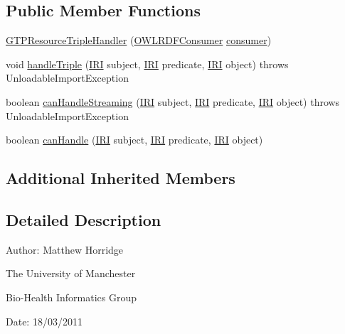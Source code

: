 \subsection*{Public Member Functions}
\begin{DoxyCompactItemize}
\item 
\hyperlink{classorg_1_1coode_1_1owlapi_1_1rdfxml_1_1parser_1_1_g_t_p_resource_triple_handler_a57b64e6c30bee13f03f3be63c5b883a1}{G\-T\-P\-Resource\-Triple\-Handler} (\hyperlink{classorg_1_1coode_1_1owlapi_1_1rdfxml_1_1parser_1_1_o_w_l_r_d_f_consumer}{O\-W\-L\-R\-D\-F\-Consumer} \hyperlink{classorg_1_1coode_1_1owlapi_1_1rdfxml_1_1parser_1_1_abstract_triple_handler_a4ccf4d898ff01eb1cadfa04b23d54e9c}{consumer})
\item 
void \hyperlink{classorg_1_1coode_1_1owlapi_1_1rdfxml_1_1parser_1_1_g_t_p_resource_triple_handler_acbafda7876f3607f88690c8ff4276bc7}{handle\-Triple} (\hyperlink{classorg_1_1semanticweb_1_1owlapi_1_1model_1_1_i_r_i}{I\-R\-I} subject, \hyperlink{classorg_1_1semanticweb_1_1owlapi_1_1model_1_1_i_r_i}{I\-R\-I} predicate, \hyperlink{classorg_1_1semanticweb_1_1owlapi_1_1model_1_1_i_r_i}{I\-R\-I} object)  throws Unloadable\-Import\-Exception 
\item 
boolean \hyperlink{classorg_1_1coode_1_1owlapi_1_1rdfxml_1_1parser_1_1_g_t_p_resource_triple_handler_ab8912bb94b89262a446f51fae341fa60}{can\-Handle\-Streaming} (\hyperlink{classorg_1_1semanticweb_1_1owlapi_1_1model_1_1_i_r_i}{I\-R\-I} subject, \hyperlink{classorg_1_1semanticweb_1_1owlapi_1_1model_1_1_i_r_i}{I\-R\-I} predicate, \hyperlink{classorg_1_1semanticweb_1_1owlapi_1_1model_1_1_i_r_i}{I\-R\-I} object)  throws Unloadable\-Import\-Exception 
\item 
boolean \hyperlink{classorg_1_1coode_1_1owlapi_1_1rdfxml_1_1parser_1_1_g_t_p_resource_triple_handler_af0986ce57997f0f2e584506efd0a019b}{can\-Handle} (\hyperlink{classorg_1_1semanticweb_1_1owlapi_1_1model_1_1_i_r_i}{I\-R\-I} subject, \hyperlink{classorg_1_1semanticweb_1_1owlapi_1_1model_1_1_i_r_i}{I\-R\-I} predicate, \hyperlink{classorg_1_1semanticweb_1_1owlapi_1_1model_1_1_i_r_i}{I\-R\-I} object)
\end{DoxyCompactItemize}
\subsection*{Additional Inherited Members}


\subsection{Detailed Description}
Author\-: Matthew Horridge\par
 The University of Manchester\par
 Bio-\/\-Health Informatics Group\par
 Date\-: 18/03/2011 

